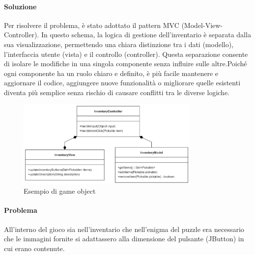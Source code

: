 \documentclass[a4paper,12pt]{report}
\begin{document}
\paragraph{Soluzione}Per risolvere il problema, è stato adottato il pattern MVC (Model-View-Controller). In questo schema, la logica di gestione dell'inventario è separata dalla sua visualizzazione, permettendo una chiara distinzione tra i dati (modello), l'interfaccia utente (vista) e il controllo (controller). Questa separazione consente di isolare le modifiche in una singola componente senza influire sulle altre.Poiché ogni componente ha un ruolo chiaro e definito, è più facile mantenere e aggiornare il codice, aggiungere nuove funzionalità o migliorare quelle esistenti diventa più semplice senza rischio di causare conflitti tra le diverse logiche.
\begin{figure}[h]  %
    \centering
    \includegraphics[width=0.8\textwidth]{img/inventory.png}  %
    \caption{Esempio di game object}
    \label{img:gameObject}
\end{figure}
%
\paragraph{Problema}All’interno del gioco sia nell'inventario che nell'enigma del puzzle era necessario che le immagini fornite si adattassero alla dimensione del pulsante (JButton) in cui erano contenute.
%
\end{document}
